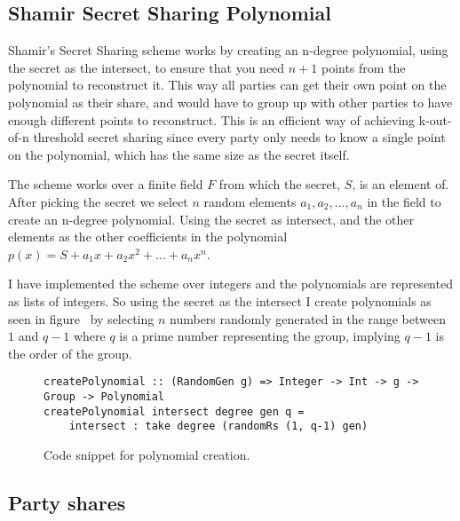 \documentclass[a4paper,oneside,12pt,final]{article}
\begin{document}
\subsection{Shamir Secret Sharing Polynomial}

Shamir's Secret Sharing scheme works by creating an n-degree polynomial,
using the secret as the intersect, to ensure that you need $n+1$ points from the
polynomial to reconstruct it. This way all parties can get their own point on
the polynomial as their share, and would have to group up with other parties to
have enough different points to reconstruct. This is an efficient way of
achieving k-out-of-n threshold secret sharing since every party only needs to
know a single point on the polynomial, which has the same size as the secret
itself.

The scheme works over a finite field $F$ from which the secret, $S$, is an
element of. After picking the secret we select $n$ random elements $a_1, a_2,
..., a_n$ in the field to create an n-degree polynomial. Using the secret as
intersect, and the other elements as the other coefficients in the polynomial
$p(x) = S + a_1x + a_2x^2 + ... + a_nx^n$.

I have implemented the scheme over integers and the polynomials are represented
as lists of integers. So using the secret as the intersect I create polynomials
as seen in figure~\pageref{fig:create-polynomial} by selecting $n$ numbers
randomly generated in the range between $1$ and $q-1$ where $q$ is a prime
number representing the group, implying $q-1$ is the order of the group.
\footnotemark

\newpage

\begin{figure}[h]
\label{fig:create-polynomial}
\begin{verbatim}
createPolynomial :: (RandomGen g) => Integer -> Int -> g -> Group -> Polynomial
createPolynomial intersect degree gen q =
    intersect : take degree (randomRs (1, q-1) gen)
\end{verbatim}
\caption{Code snippet for polynomial creation.}
\end{figure}


\subsection{Party shares}
\end{document}
